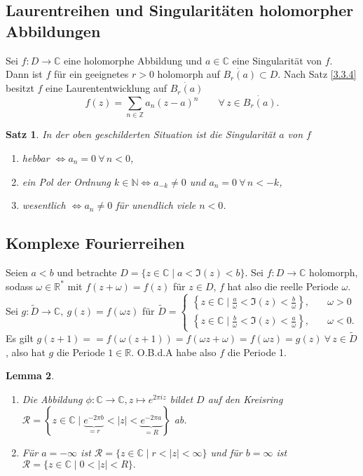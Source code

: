 \documentclass[a4paper,12pt]{book}
\theoremstyle{newthm}
\newtheorem{thm}{Satz}[section]
\newtheorem{lem}[thm]{Lemma}
\theoremstyle{newdef}
\theoremstyle{newrem}
\newcommand{\N}{\mathbb{N}}
\newcommand{\Z}{\mathbb{Z}}
\newcommand{\R}{\mathbb{R}}
\newcommand{\C}{\mathbb{C}}
\begin{document}
		\subsection*{Laurentreihen und Singularitäten holomorpher Abbildungen}
		
		Sei $ f: D \to \C $ eine holomorphe Abbildung und $a \in \C$ eine Singularität von $f$. Dann ist $f$ für ein geeignetes $ r > 0$ holomorph auf $ \dot{B_r(a)} \subset D $. Nach Satz \ref{3.3.4} besitzt $f$ eine Laurententwicklung auf $ \dot{B_r(a)} $
		\[ f(z) = \sum_{n \in \Z} a_n(z-a)^n\qquad \forall\, z \in \dot{B_r(a)}. \] 
		
		\begin{thm}\label{3.3.5}
			In der oben geschilderten Situation ist die Singularität $a$ von $f$
			\begin{enumerate}[label={\roman*})]
				\item \emph{hebbar} $\iff a_n = 0 \ \forall\, n<0$,
				\item ein \emph{Pol} der Ordnung $k \in \N \iff a_{-k} \neq 0 $ und $a_n=0 \ \forall\, n < -k$,
				\item \emph{wesentlich} $\iff a_n \neq 0$ für unendlich viele $n < 0$.
			\end{enumerate}
		\end{thm}
		
		\subsection*{Komplexe Fourierreihen}
		
		Seien $ a<b $ und betrachte $ D = \{z \in \C \mid a < \Im(z) < b\}. $ Sei $ f: D \to \C $ holomorph, sodass $ \omega \in \R^* $ mit $ f(z + \omega) = f(z) $ für $z \in D$, $f$ hat also die reelle Periode $\omega$.\\
		Sei $g: \tilde{D} \to \C,\ g(z) = f(\omega z)$ für $\tilde{D} = \begin{cases}
		\left\{ z \in \C \mid \frac{a}{\omega} < \Im(z) < \frac{b}{\omega} \right\}, \quad &\omega > 0\\
		\left\{ z \in \C \mid \frac{b}{\omega} < \Im(z) < \frac{a}{\omega} \right\}, \quad &\omega < 0.
		\end{cases}$\\
		Es gilt $ g(z+1) = = f(\omega(z+1)) = f(\omega z + \omega) = f(\omega z) = g(z)\ \forall \,z \in \tilde{D} $, also hat $g$ die Periode $1 \in \R$. O.B.d.A  habe also $f$ die Periode 1.
		
		\begin{lem}
			\begin{enumerate}[label={\roman*})]
				\item Die Abbildung $ \phi: \C\to \C, z \mapsto e^{2\pi iz} $ bildet $D$ auf den Kreisring $ \mathcal{R} = \left\{ z \in \C \mid \underbrace{e^{-2\pi b}}_{=r} < |z| < \underbrace{e^{-2\pi a}}_{=R} \right\} $ ab.
				\item Für $ a = - \infty $ ist $ \mathcal{R} = \{z \in \C \mid r < |z| < \infty\} $ und für $ b = \infty $ ist $ \mathcal{R} = \{ z\in \C \mid 0 < |z| < R\}. $
			\end{enumerate}
		\end{lem}
		
\end{document}
